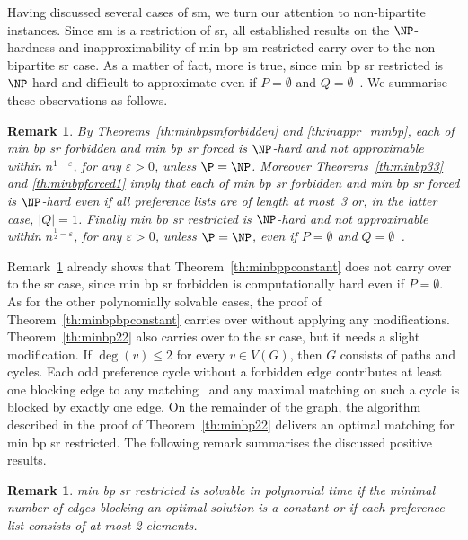 \documentclass[preprint,12pt]{elsarticle}
\newtheorem{remark}[theorem]{Remark}
\begin{document}
Having discussed several cases of {\sc sm}, we turn our attention to non-bipartite instances. Since {\sc sm} is a restriction of {\sc sr}, all established results on  the $\NP$-hardness and inapproximability of {\sc min bp sm restricted} carry over to the non-bipartite {\sc sr} case. As a matter of fact, more is true, since {\sc min bp sr restricted} is $\NP$-hard and difficult to approximate even if $P=\emptyset$ and $Q=\emptyset$~\cite{ABM06}.  We summarise these observations as follows.


\begin{remark}
\label{re:sr_minbp}
By Theorems~\ref{th:minbpsmforbidden} and \ref{th:inappr_minbp}, each of
{\sc min bp sr forbidden} and {\sc min bp sr forced} is $\NP$-hard and not approximable within $n^{1-\varepsilon}$, for any $\varepsilon > 0$, unless $\P=\NP$.  Moreover Theorems~\ref{th:minbp33} and \ref{th:minbpforced1} imply that each of
{\sc min bp sr forbidden} and {\sc min bp sr forced} is $\NP$-hard even if all preference lists are of length at most~3 or, in the latter case, $|Q| = 1$.  Finally {\sc min bp sr restricted} is $\NP$-hard and not approximable within $n^{\frac{1}{2}-\varepsilon}$, for any $\varepsilon > 0$, unless $\P=\NP$, even if $P=\emptyset$ and $Q=\emptyset$~\cite{ABM06}. 
\end{remark}

Remark~\ref{re:sr_minbp} already shows that Theorem~\ref{th:minbppconstant} does not carry over to the {\sc sr} case, since {\sc min bp sr forbidden} is computationally hard even if $P=\emptyset$. As for the other polynomially solvable cases, the proof of Theorem~\ref{th:minbpbpconstant} carries over without applying any modifications. Theorem~\ref{th:minbp22} also carries over to the {\sc sr} case, but it needs a slight modification. If $\deg(v) \leq 2$ for every $v \in V(G)$, then $G$ consists of paths and cycles. Each odd preference cycle without a forbidden edge contributes at least one blocking edge to any matching~\cite{Tan91} and any maximal matching on such a cycle is blocked by exactly one edge. On the remainder of the graph, the algorithm described in the proof of Theorem~\ref{th:minbp22} delivers an optimal matching for {\sc min bp sr restricted}. The following remark summarises the discussed positive results.

\begin{remark}
{\sc min bp sr restricted} is solvable in polynomial time if the minimal number of edges blocking an optimal solution is a constant or if each preference list consists of at most 2 elements.
\end{remark}
\end{document}
